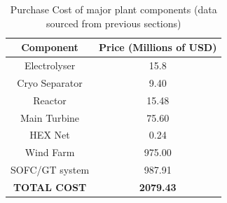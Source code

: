 \begin{table}[h]
\centering
\caption{Purchase Cost of major plant components (data sourced from previous sections)}
\label{LMtable:componentPC}
\begin{tabular}{|c|c|}
\hline
\textbf{Component}  & \textbf{Price (Millions of USD)} \\ \hline
Electrolyser        & 15.8                             \\ \hline
Cryo Separator      & 9.40                             \\ \hline
Reactor             & 15.48                             \\ \hline
Main Turbine        & 75.60                            \\ \hline
HEX Net             & 0.24                             \\ \hline
Wind Farm           & 975.00                           \\ \hline
SOFC/GT system      & 987.91                           \\ \hline
\textbf{TOTAL COST} & \textbf{2079.43}                 \\ \hline
\end{tabular}
\end{table}

